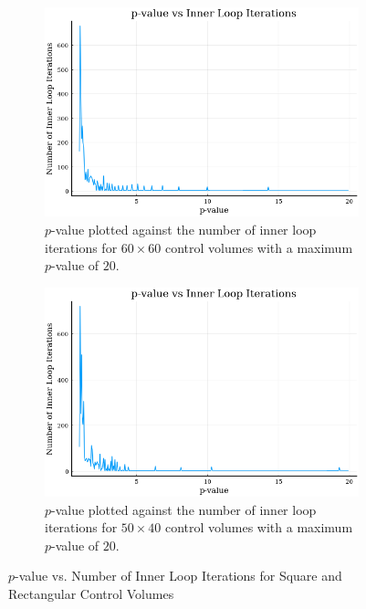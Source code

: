 \begin{figure}
	\begin{center}
	\begin{subfigure}{0.8\textwidth}
		\includegraphics[width=\linewidth]{Chapter_III_Implementation_and_Results/Images/60x60-p_vs_Inner-Itter.png}
		\caption[$p$-value vs. $T_{av}$]{$p$-value plotted against the number of inner loop iterations for $60\times 60$ control volumes with a maximum $p$-value of $20$.}
		\label{fig:p-vs-Inner-Itter-60x60}
	\end{subfigure}
	\end{center}
	\vspace{1em}
	\begin{center}
	\begin{subfigure}{0.8\textwidth}
		\includegraphics[width=\linewidth]{Chapter_III_Implementation_and_Results/Images/50x40-p_vs_Inner-Itter.png}
		\caption[$p$-value vs. $T_{av}$]{$p$-value plotted against the number of inner loop iterations for $50\times 40$ control volumes with a maximum $p$-value of $20$.}
		\label{fig:p-vs-Inner-Itter-50x40}
	\end{subfigure}
	\end{center}
	\caption[$p$-value vs. Number of Inner Loop Iterations]{$p$-value vs. Number of Inner Loop Iterations for Square and Rectangular Control Volumes}
	\label{fig:p-vs-Inner-Itter}
\end{figure}


